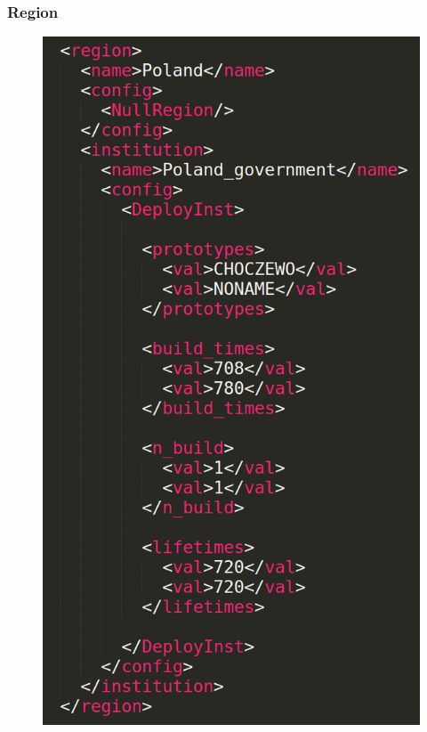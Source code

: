 \begin{frame}
    \frametitle{Region}
\begin{figure}[htbp!]
        \begin{center}
                \includegraphics[height=.8\textheight]{./images/region.png}
        \end{center}
    \end{figure}

\end{frame}

